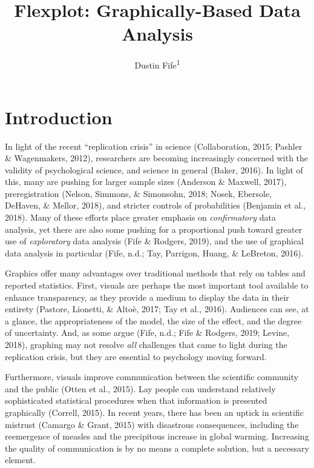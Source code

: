 \documentclass[
  doc]{apa6}
\affiliation{
\vspace{0.5cm}
\textsuperscript{1} Rowan University}
\title{Flexplot: Graphically-Based Data Analysis}
\author{Dustin Fife\textsuperscript{1}}
\date{}
\begin{document}
\maketitle

\hypertarget{introduction}{%
\section{Introduction}\label{introduction}}

In light of the recent \enquote{replication crisis} in science (Collaboration, 2015; Pashler \& Wagenmakers, 2012), researchers are becoming increasingly concerned with the validity of psychological science, and science in general (Baker, 2016). In light of this, many are pushing for larger sample sizes (Anderson \& Maxwell, 2017), preregistration (Nelson, Simmons, \& Simonsohn, 2018; Nosek, Ebersole, DeHaven, \& Mellor, 2018), and stricter controls of probabilities (Benjamin et al., 2018). Many of these efforts place greater emphasis on \emph{confirmatory} data analysis, yet there are also some pushing for a proportional push toward greater use of \emph{exploratory} data analysis (Fife \& Rodgers, 2019), and the use of graphical data analysis in particular (Fife, n.d.; Tay, Parrigon, Huang, \& LeBreton, 2016).

Graphics offer many advantages over traditional methods that rely on tables and reported statistics. First, visuals are perhaps the most important tool available to enhance transparency, as they provide a medium to display the data in their entirety (Pastore, Lionetti, \& Altoè, 2017; Tay et al., 2016). Audiences can see, at a glance, the appropriateness of the model, the size of the effect, and the degree of uncertainty. And, as some argue (Fife, n.d.; Fife \& Rodgers, 2019; Levine, 2018), graphing may not resolve \emph{all} challenges that came to light during the replication crisis, but they are essential to psychology moving forward.

Furthermore, visuals improve communication between the scientific community and the public (Otten et al., 2015). Lay people can understand relatively sophisticated statistical procedures when that information is presented graphically (Correll, 2015). In recent years, there has been an uptick in scientific mistrust (Camargo \& Grant, 2015) with disastrous consequences, including the reemergence of measles and the precipitous increase in global warming. Increasing the quality of communication is by no means a complete solution, but a necessary element.
\end{document}

